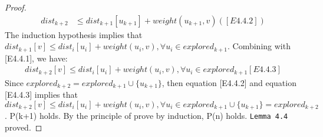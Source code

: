 \begin{proof}
\begin{align*}
  dist_{k+2} &\leq dist_{k+1}[u_{k+1}] + weight(u_{k+1}, v)([E4.4.2])
\end{align*}
The induction hypothesis implies that $dist_{k+1}[v] \leq dist_i[u_i] + weight(u_i, v), \forall u_i \in explored_{k+1}$. Combining with [E4.4.1], we have: 
\begin{align*}
dist_{k+2}[v] \leq dist_i[u_i] + weight(u_i, v), \forall u_i \in explored_{k+1} [E4.4.3]
\end{align*}
Since $explored_{k+2} = explored_{k+1} \cup \{u_{k+1}\}$, then equation [E4.4.2] and equation [E4.4.3] implies that $dist_{k+2}[v] \leq dist_i[u_i] + weight(u_i, v), \forall u_i \in explored_{k+1} \cup \{u_{k+1}\} = explored_{k+2}$. P(k+1) holds. By the principle of prove by induction, P(n) holds. \texttt{Lemma 4.4} proved. 
\end{proof}
\tab\\